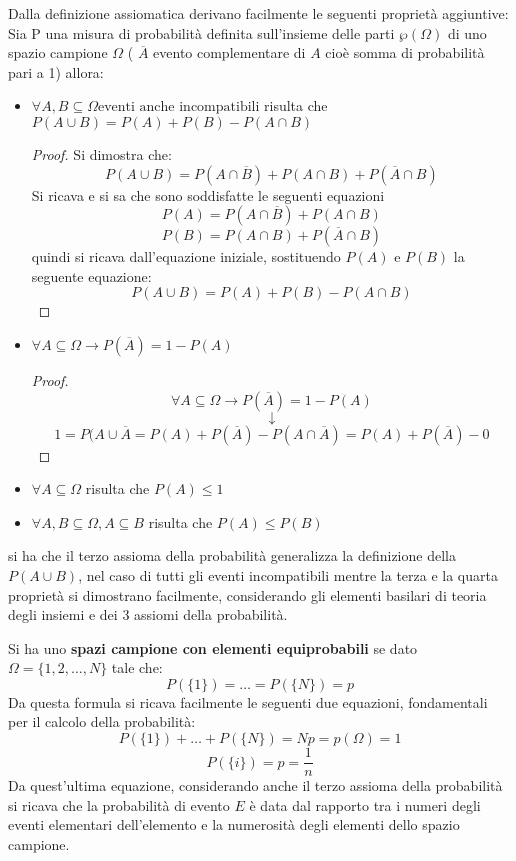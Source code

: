 \documentclass[a4paper,12pt, oneside]{book}
\begin{document}
Dalla definizione assiomatica derivano facilmente le seguenti proprietà aggiuntive:
Sia P una misura di probabilità definita sull'insieme delle parti $\wp(\Omega)$ di uno
spazio campione $\Omega$ ( $\overline{A}$ evento complementare di $A$ cioè somma di probabilità pari a 1) allora:
    \begin{itemize}
        \item $\forall A, B \subseteq \Omega \mbox{eventi anche incompatibili}$ risulta che
                $P(A \cup B) = P(A) + P(B) - P(A \cap B)$
                \begin{proof}
                 Si dimostra che:
                \[ P(A \cup B) = P(A \cap \overline{B}) + P(A \cap B) + P(\overline{A} \cap B)\]
                 Si ricava e si sa che sono soddisfatte le seguenti equazioni
                 \[P(A) = P(A \cap \overline{B}) + P(A \cap B) \]
                 \[P(B) = P(A \cap B) + P(\overline{A} \cap B) \]
                        quindi si ricava dall'equazione iniziale, sostituendo $P(A)$ e $P(B)$ la seguente equazione:
                    \[P(A \cup B) = P(A) + P(B) - P(A \cap B)\]
                \end{proof}
        \item $\forall A \subseteq \Omega \to P(\overline{A}) = 1 - P(A)$
              \begin{proof}
                    \[  \forall A\subseteq \Omega \to P(\overline{A})=1-P(A)\]
                        \[\downarrow\]
                    \[ 1 = P(A \cup \overline{A} = P(A) + P(\overline{A}) - P(A \cap \overline{A}) = P(A) + P(\overline{A}) - 0\]
              \end{proof}
        \item $\forall A\subseteq \Omega$ risulta che $ P(A)\leq 1$
        \item $\forall A,B\subseteq \Omega, A\subseteq B$ risulta che $P(A)\leq P(B)$
    \end{itemize}
si ha che il terzo assioma della probabilità generalizza la definizione della $P(A \cup B)$,
nel caso di tutti gli eventi incompatibili mentre la terza e la quarta proprietà si dimostrano facilmente,
considerando gli elementi basilari di teoria degli insiemi e dei 3 assiomi della probabilità.

Si ha uno \textbf{spazi campione con elementi equiprobabili} se dato $\Omega = \{1, 2, \dots, N\}$ tale che:
\[P(\{1\}) = \dots = P(\{N\}) = p \]
Da questa formula si ricava facilmente le seguenti due equazioni, fondamentali per il calcolo della probabilità:
\[P(\{1\}) + \dots + P(\{N\}) = Np = p(\Omega) = 1\]
\[P(\{i\}) = p = \frac{1}{n}\]
Da quest'ultima equazione, considerando anche il terzo assioma della probabilità si ricava che la probabilità
di evento $E$ è data dal rapporto tra i numeri degli eventi elementari dell'elemento e la numerosità degli
elementi dello spazio campione.
\end{document}
